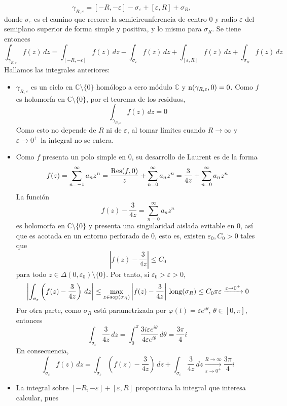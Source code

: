 \documentclass[11pt]{report}
\makeatletter
\renewenvironment{proof}[1][\proofname]{\par
  \pushQED{\qed}%
  \normalfont \topsep\z@skip %
  \trivlist
  \item[\hskip\labelsep
        \itshape
    #1\@addpunct{.}]\ignorespaces
}{%
  \popQED\endtrivlist\@endpefalse
}
\newcommand{\C}{\mathbb C}
\makeatother
\begin{document}
\begin{proof}
\begin{enumerate}
\[\gamma_{R,\varepsilon} = [-R,-\varepsilon]-\sigma_\varepsilon+[\varepsilon,R] + \sigma_R,\]
donde $\sigma_\varepsilon$ es el camino que recorre la semicircunferencia de centro $0$ y radio $\varepsilon$ del semiplano superior de forma simple y positiva, y lo mismo para $\sigma_R$. Se tiene entonces
\[\int_{\gamma_{R,\varepsilon}} f(z) \, dz = \int_{[-R,-\varepsilon]}f(z)\, dz-\int_{\sigma_\varepsilon} f(z) \, dz +\int_{[\varepsilon,R]}f(z) \, dz + \int_{\sigma_R} f(z) \, dz\]
Hallamos las integrales anteriores:
\begin{itemize}
  \item $\gamma_{R,\varepsilon}$ es un ciclo en $\C \setminus \{0\}$ homólogo a cero módulo $\C$ y $\textup{n}(\gamma_{R,\varepsilon},0) = 0$. Como $f$ es holomorfa en $\C \setminus \{0\}$, por el teorema de los residuos,
  \[\int_{\gamma_{R,\varepsilon}} f(z) \, dz = 0\]
  Como esto no depende de $R$ ni de $\varepsilon$, al tomar límites cuando $R \to \infty$ y $\varepsilon \to 0^+$ la integral no se entera.
  \item Como $f$ presenta un polo simple en $0$, su desarrollo de Laurent es de la forma
  \[f(z)=\sum_{n=-1}^\infty a_nz^n = \frac{\textup{Res}(f,0)}{z}+\sum_{n=0}^\infty a_nz^n=\frac{3}{4z}+\sum_{n=0}^\infty a_nz^n\]
  La función
  \[f(z)-\frac{3}{4z} = \sum_{n=0}^\infty a_nz^n\]  
  es holomorfa en $\C \setminus \{0\}$ y presenta una singularidad aislada evitable en $0$, así que es acotada en un entorno perforado de $0$, esto es, existen $\varepsilon_0,C_0>0$ tales que
  \[\left|f(z)-\frac{3}{4z}\right| \leq C_0\]
  para todo $z \in \Delta(0,\varepsilon_0) \setminus \{0\}$. Por tanto, si $\varepsilon_0>\varepsilon>0$,
  \[\left|\int_{\sigma_\varepsilon}\left(f(z)-\frac{3}{4z}\right)\, dz \right| \leq \max_{z \in \textup{sop}(\sigma_R)} \left|f(z)-\frac{3}{4z}\right| \, \textup{long}(\sigma_R) \leq C_0\pi \varepsilon \xrightarrow[]{\varepsilon \to 0^+} 0\]
  Por otra parte, como $\sigma_R$ está parametrizada por $\varphi(t)=\varepsilon e^{i\theta}$, $\theta \in [0,\pi]$, entonces
  \[\int_{\sigma_\varepsilon} \frac{3}{4z} \, dz = \int_0^\pi \frac{3i\varepsilon e^{i\theta}}{4\varepsilon e^{i\theta}}\, d\theta =\frac{3\pi}{4}i \,\]
  En consecuencia,
  \[\int_{\sigma_\varepsilon} f(z) \, dz = \int_{\sigma_\varepsilon}\left(f(z)-\frac{3}{4z}\right) \, dz + \int_{\sigma_\varepsilon} \frac{3}{4z} \, dz \xrightarrow[\varepsilon \to 0^+]{R \to \infty} \frac{3\pi}{4}i  \]
  \item La integral sobre $[-R,-\varepsilon]+[\varepsilon,R]$ proporciona la integral que interesa calcular, pues

\end{itemize}
\end{enumerate}
\end{proof}
\end{document}
